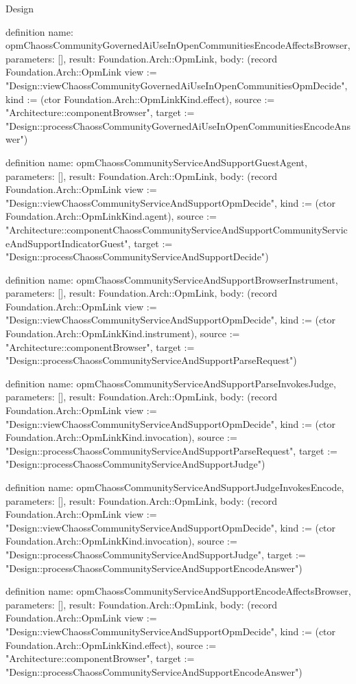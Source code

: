 \begin{lexlean}{Design}
\begin{semanticmodule}
definition{
  name: opmChaossCommunityGovernedAiUseInOpenCommunitiesEncodeAffectsBrowser,
  parameters: [],
  result: Foundation.Arch::OpmLink,
  body: (record Foundation.Arch::OpmLink {view := "Design::viewChaossCommunityGovernedAiUseInOpenCommunitiesOpmDecide", kind := (ctor Foundation.Arch::OpmLinkKind.effect), source := "Architecture::componentBrowser", target := "Design::processChaossCommunityGovernedAiUseInOpenCommunitiesEncodeAnswer"})
}

definition{
  name: opmChaossCommunityServiceAndSupportGuestAgent,
  parameters: [],
  result: Foundation.Arch::OpmLink,
  body: (record Foundation.Arch::OpmLink {view := "Design::viewChaossCommunityServiceAndSupportOpmDecide", kind := (ctor Foundation.Arch::OpmLinkKind.agent), source := "Architecture::componentChaossCommunityServiceAndSupportCommunityServiceAndSupportIndicatorGuest", target := "Design::processChaossCommunityServiceAndSupportDecide"})
}

definition{
  name: opmChaossCommunityServiceAndSupportBrowserInstrument,
  parameters: [],
  result: Foundation.Arch::OpmLink,
  body: (record Foundation.Arch::OpmLink {view := "Design::viewChaossCommunityServiceAndSupportOpmDecide", kind := (ctor Foundation.Arch::OpmLinkKind.instrument), source := "Architecture::componentBrowser", target := "Design::processChaossCommunityServiceAndSupportParseRequest"})
}

definition{
  name: opmChaossCommunityServiceAndSupportParseInvokesJudge,
  parameters: [],
  result: Foundation.Arch::OpmLink,
  body: (record Foundation.Arch::OpmLink {view := "Design::viewChaossCommunityServiceAndSupportOpmDecide", kind := (ctor Foundation.Arch::OpmLinkKind.invocation), source := "Design::processChaossCommunityServiceAndSupportParseRequest", target := "Design::processChaossCommunityServiceAndSupportJudge"})
}

definition{
  name: opmChaossCommunityServiceAndSupportJudgeInvokesEncode,
  parameters: [],
  result: Foundation.Arch::OpmLink,
  body: (record Foundation.Arch::OpmLink {view := "Design::viewChaossCommunityServiceAndSupportOpmDecide", kind := (ctor Foundation.Arch::OpmLinkKind.invocation), source := "Design::processChaossCommunityServiceAndSupportJudge", target := "Design::processChaossCommunityServiceAndSupportEncodeAnswer"})
}

definition{
  name: opmChaossCommunityServiceAndSupportEncodeAffectsBrowser,
  parameters: [],
  result: Foundation.Arch::OpmLink,
  body: (record Foundation.Arch::OpmLink {view := "Design::viewChaossCommunityServiceAndSupportOpmDecide", kind := (ctor Foundation.Arch::OpmLinkKind.effect), source := "Architecture::componentBrowser", target := "Design::processChaossCommunityServiceAndSupportEncodeAnswer"})
}


\end{semanticmodule}
\end{lexlean}
